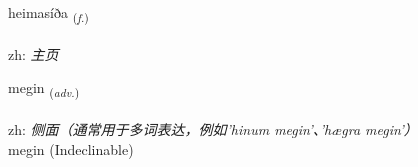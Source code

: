 \documentclass[frontgrid, backgrid]{flacards}\usepackage[]{graphicx}\usepackage[]{color}
\begin{document}
\renewcommand{\flhead}{\vskip5pt \fboxsep=0pt {\small\bfseries\footnotesize Nafnorð | 名词}}
\renewcommand{\fcfoot}{\vskip5pt \fboxsep=0pt \hspace{2pt}{\small\bfseries\footnotesize 2K}}

\renewcommand{\blhead}{\vskip5pt {\small\bfseries\footnotesize Nafnorð | 名词 }}
\renewcommand{\bcfoot}{\vskip5pt \hspace{2pt}{\small\bfseries\footnotesize 2K}}


{heimasíða \small{\textsubscript{(\textit{f.})}} \\[1ex] %
\textphonetic{[heiːmasiða]} \\
zh: \emph{主页} \\  [2ex]
\renewcommand*{\arraystretch}{0.8}
}


\renewcommand{\flhead}{\vskip5pt \fboxsep=0pt {\small\bfseries\footnotesize Atviksorð | 副词}}
\renewcommand{\fcfoot}{\vskip5pt \fboxsep=0pt \hspace{2pt}{\small\bfseries\footnotesize 2K}}

\renewcommand{\blhead}{\vskip5pt {\small\bfseries\footnotesize Atviksorð | 副词 }}
\renewcommand{\bcfoot}{\vskip5pt \hspace{2pt}{\small\bfseries\footnotesize 2K}}


{megin \small{\textsubscript{(\textit{adv.})}} \\[1ex]
\textphonetic{[meijɪn]} \\
zh: \emph{侧面（通常用于多词表达，例如'hinum megin'、'hægra megin'）} \\  [2ex]
megin (Indeclinable)}

\renewcommand{\flhead}{\vskip5pt \fboxsep=0pt {\small\bfseries\footnotesize Nafnorð | 名词}}
\renewcommand{\fcfoot}{\vskip5pt \fboxsep=0pt \hspace{2pt}{\small\bfseries\footnotesize 2K}}
\end{document}

